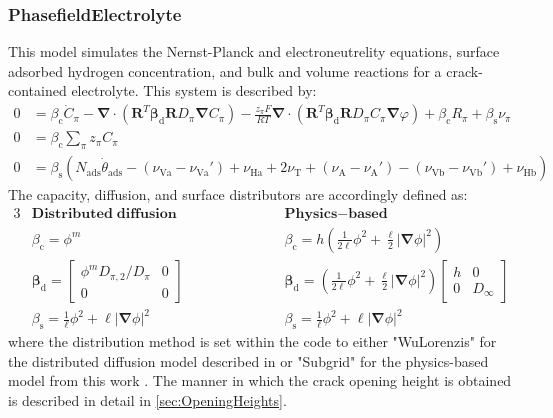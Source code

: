 \documentclass[3p]{elsarticle} %
\begin{document}
\subsubsection{PhasefieldElectrolyte}
\label{sec:CrackElectrolyte}
This model simulates the Nernst-Planck and electroneutrelity equations, surface adsorbed hydrogen concentration, and bulk and volume reactions for a crack-contained electrolyte. This system is described by:
\begin{align}
    0 &= \beta_\mathrm{c} \dot{C}_{\pi} - \bm{\nabla} \cdot \left(\bm{R}^T\bm{\beta_\mathrm{d}}\bm{R} D_{\pi} \bm{\nabla} C_\pi \right) - \frac{z_\pi F}{RT}\bm{\nabla} \cdot \left(\bm{R}^T\bm{\beta_\mathrm{d}}\bm{R} D_{\pi} C_\pi \bm{\nabla} \varphi \right) + \beta_\mathrm{c} R_\pi  + \beta_\mathrm{s} \nu_\pi \label{eq:electrolyte_nernstplanck}\\
    0 &= \beta_\mathrm{c} \sum_\pi z_\pi C_\pi \label{eq:electrolyte_neutrality} \\
    0 & =\beta_\mathrm{s} \left(N_{\mathrm{ads}} \dot{\theta}_{\mathrm{ads}} - (\nu_{\mathrm{Va}}-\nu_{\mathrm{Va}}') + \nu_{\mathrm{Ha}} + 2 \nu_\mathrm{T} + (\nu_\mathrm{A}-\nu_\mathrm{A}') - (\nu_{\mathrm{Vb}}-\nu_{\mathrm{Vb}}') + \nu_{\mathrm{Hb}}\right) \label{eq:electrolyte_surface}
\end{align}
The capacity, diffusion, and surface distributors are accordingly defined as:
\begin{alignat}{3}
\nonumber & \mathbf{Distributed}\; \mathbf{diffusion} &&  \qquad\qquad && \mathbf{Physics}\mathbf{-}\mathbf{based} \\
&\beta_\mathrm{c} = \phi^m && && \beta_\mathrm{c} = h \left( \frac{1}{2\ell}\phi^2+\frac{\ell}{2}\left|\bm{\nabla} \phi \right|^2 \right) \label{eq:betac} \\
&\bm{\beta}_\mathrm{d} = \begin{bmatrix} \phi^m D_{\pi,2}/D_\pi & 0\\ 0 & 0 \end{bmatrix} && && \bm{\beta}_\mathrm{d} = \left( \frac{1}{2\ell}\phi^2+\frac{\ell}{2}\left|\bm{\nabla} \phi \right|^2 \right) \begin{bmatrix} h & 0\\ 0 & D_{\infty} \end{bmatrix} \\
&\beta_\mathrm{s} = \frac{1}{\ell}\phi^2+\ell\left|\bm{\nabla} \phi \right|^2  && && \beta_\mathrm{s} = \frac{1}{\ell}\phi^2+\ell\left|\bm{\nabla} \phi \right|^2 \label{eq:betas}
\end{alignat}
where the distribution method is set within the code to either "WuLorenzis" for the distributed diffusion model described in \citep{Wu2016} or "Subgrid" for the physics-based model from this work \citep{Hageman2023}. The manner in which the crack opening height is obtained is described in detail in \cref{sec:OpeningHeights}. 
\end{document}
